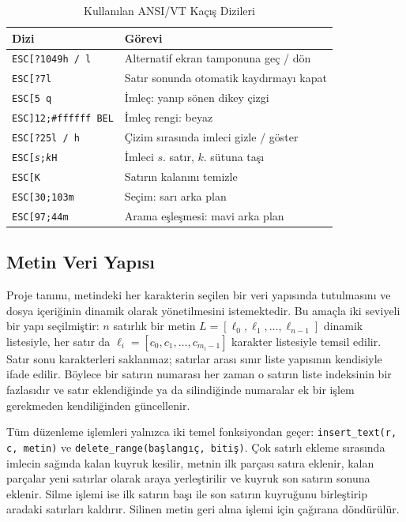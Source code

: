 \documentclass[conference,a4paper]{IEEEtran}
\newcommand{\kod}[1]{\texttt{#1}}
\begin{document}
\begin{table}[t]
\centering
\caption{Kullanılan ANSI/VT Kaçış Dizileri}
\label{tab:vt}
\begin{tabular}{@{}ll@{}}
\toprule
\textbf{Dizi} & \textbf{Görevi} \\
\midrule
\kod{ESC[?1049h / l} & Alternatif ekran tamponuna geç / dön \\
\kod{ESC[?7l} & Satır sonunda otomatik kaydırmayı kapat \\
\kod{ESC[5~q} & İmleç: yanıp sönen dikey çizgi \\
\kod{ESC]12;\#ffffff BEL} & İmleç rengi: beyaz \\
\kod{ESC[?25l / h} & Çizim sırasında imleci gizle / göster \\
\kod{ESC[\textit{s};\textit{k}H} & İmleci $s$. satır, $k$. sütuna taşı \\
\kod{ESC[K} & Satırın kalanını temizle \\
\kod{ESC[30;103m} & Seçim: sarı arka plan \\
\kod{ESC[97;44m} & Arama eşleşmesi: mavi arka plan \\
\bottomrule
\end{tabular}
\end{table}

\subsection{Metin Veri Yapısı}

Proje tanımı, metindeki her karakterin seçilen bir veri yapısında tutulmasını ve dosya içeriğinin dinamik olarak yönetilmesini istemektedir. Bu amaçla iki seviyeli bir yapı seçilmiştir: $n$ satırlık bir metin $L = [\ell_0, \ell_1, \ldots, \ell_{n-1}]$ dinamik listesiyle, her satır da $\ell_i = [c_0, c_1, \ldots, c_{m_i-1}]$ karakter listesiyle temsil edilir. Satır sonu karakterleri saklanmaz; satırlar arası sınır liste yapısının kendisiyle ifade edilir. Böylece bir satırın numarası her zaman o satırın liste indeksinin bir fazlasıdır ve satır eklendiğinde ya da silindiğinde numaralar ek bir işlem gerekmeden kendiliğinden güncellenir.

Tüm düzenleme işlemleri yalnızca iki temel fonksiyondan geçer: \kod{insert\_text(r, c, metin)} ve \kod{delete\_range(başlangıç, bitiş)}. Çok satırlı ekleme sırasında imlecin sağında kalan kuyruk kesilir, metnin ilk parçası satıra eklenir, kalan parçalar yeni satırlar olarak araya yerleştirilir ve kuyruk son satırın sonuna eklenir. Silme işlemi ise ilk satırın başı ile son satırın kuyruğunu birleştirip aradaki satırları kaldırır. Silinen metin geri alma işlemi için çağırana döndürülür.
\end{document}
